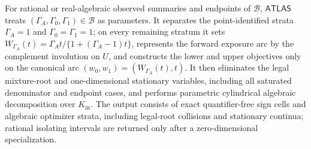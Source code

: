 For rational or real-algebraic observed summaries and endpoints of \(\mathcal B\), \(\mathsf{ATLAS}\) treats \((\Gamma_A,\Gamma_0,\Gamma_1)\in\mathcal B\) as parameters.  It separates the point-identified strata \(\Gamma_A=1\) and \(\Gamma_0=\Gamma_1=1\); on every remaining stratum it sets \(W_{\Gamma_A}(t)=\Gamma_A t/\{1+(\Gamma_A-1)t\}\), represents the forward exposure arc by the complement involution on \(U\), and constructs the lower and upper objectives only on the canonical arc \((w_0,w_1)=(W_{\Gamma_A}(t),t)\).  It then eliminates the legal mixture-root and one-dimensional stationary variables, including all saturated denominator and endpoint cases, and performs parametric cylindrical algebraic decomposition over \(K_{\mathrm{in}}\).  The output consists of exact quantifier-free sign cells and algebraic optimizer strata, including legal-root collisions and stationary continua; rational isolating intervals are returned only after a zero-dimensional specialization.
